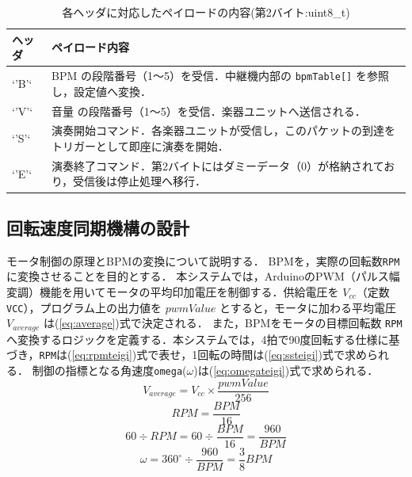 \documentclass[lualatex,book,paper=a4paper,jafontsize=11.5pt,jafontscale=1.05]{jlreq}
\begin{document}
\begin{table}[H]
    \centering
    \caption{各ヘッダに対応したペイロードの内容(第2バイト:uint8\_t)}
    \label{tab:payload}
    \begin{tabular}{lp{22em}}
    \hline
    \textbf{ヘッダ} & \textbf{ペイロード内容} \\ \hline
    `'B'` & BPM の段階番号（1～5）を受信．中継機内部の \texttt{bpmTable[]} を参照し，設定値へ変換． \\ \hline
    `'V'` & 音量 の段階番号（1～5）を受信．楽器ユニットへ送信される． \\ \hline
    `'S'` & 演奏開始コマンド．各楽器ユニットが受信し，このパケットの到達をトリガーとして即座に演奏を開始． \\ \hline
    `'E'` & 演奏終了コマンド．第2バイトにはダミーデータ（0）が格納されており，受信後は停止処理へ移行． \\ \hline
    \end{tabular}
\end{table}



\subsection{回転速度同期機構の設計}
モータ制御の原理とBPMの変換について説明する．
BPMを，実際の回転数\texttt{RPM}に変換させることを目的とする．
本システムでは，ArduinoのPWM（パルス幅変調）機能を用いてモータの平均印加電圧を制御する．供給電圧を $V_{cc}$（定数 \texttt{VCC}），プログラム上の出力値を $pwmValue$ とすると，モータに加わる平均電圧 $V_{average}$ は(\ref{eq:average})式で決定される．
また，BPMをモータの目標回転数 \texttt{RPM} へ変換するロジックを定義する．本システムでは，4拍で90度回転する仕様に基づき，\texttt{RPM}は(\ref{eq:rpmteigi})式で表せ，1回転の時間は(\ref{eq:ssteigi})式で求められる．
制御の指標となる角速度\texttt{omega}($\omega$)は(\ref{eq:omegateigi})式で求められる．
\begin{equation}
\label{eq:average}
V_{average} = V_{cc} \times \frac{pwmValue}{256}
\end{equation}
\begin{equation}
\label{eq:rpmteigi}
  RPM = \frac{BPM}{16}
\end{equation}
\begin{equation}
\label{eq:ssteigi}
  60 \div RPM = 60 \div \frac{BPM}{16} = \frac{960}{BPM}
\end{equation}
\begin{equation}
\label{eq:omegateigi}
\omega = 360^\circ \div \frac{960}{BPM} = \frac{3}{8}BPM
\end{equation}
\end{document}
